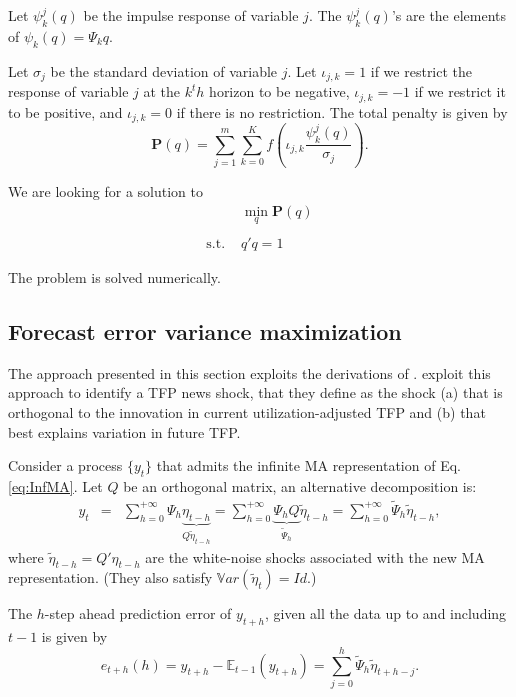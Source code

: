 \documentclass[
]{book}
\theoremstyle{definition}
\theoremstyle{definition}
\theoremstyle{definition}
\theoremstyle{definition}
\theoremstyle{remark}
\begin{document}
Let \(\psi_k^j(q)\) be the impulse response of variable \(j\). The \(\psi_k^j(q)\)'s are the elements of \(\psi_k(q)=\Psi_kq\).

Let \(\sigma_j\) be the standard deviation of variable \(j\). Let \(\iota_{j,k}=1\) if we restrict the response of variable \(j\) at the \(k^th\) horizon to be negative, \(\iota_{j,k}=-1\) if we restrict it to be positive, and \(\iota_{j,k}=0\) if there is no restriction. The total penalty is given by \[
\mathbf{P}(q)=\sum_{j=1}^m\sum_{k=0}^Kf\left(\iota_{j,k}\frac{\psi_k^j(q)}{\sigma_j}\right).
\]

We are looking for a solution to
\[\begin{array}{ll}&\min_q \mathbf{P}(q)\\
&\\
\text{s.t. }&q'q=1\end{array}\]

The problem is solved numerically.

\hypertarget{forecast-error-variance-maximization}{%
\subsection{Forecast error variance maximization}\label{forecast-error-variance-maximization}}

The approach presented in this section exploits the derivations of \citet{Uhlig_2004}. \citet{BARSKY2011273} exploit this approach to identify a TFP news shock, that they define as the shock (a) that is orthogonal to the innovation in current utilization-adjusted TFP and (b) that best explains variation in future TFP.

Consider a process \(\{y_t\}\) that admits the infinite MA representation of Eq. \eqref{eq:InfMA}. Let \(Q\) be an orthogonal matrix, an alternative decomposition is:
\begin{eqnarray}
y_t&=&\sum_{h=0}^{+\infty}\Psi_h\underbrace{\eta_{t-h}}_{Q\tilde \eta_{t-h}} = \sum_{h=0}^{+\infty}\underbrace{\Psi_hQ}_{\tilde\Psi_h}\tilde
\eta_{t-h} = \sum_{h=0}^{+\infty}\tilde\Psi_h\tilde \eta_{t-h},
\end{eqnarray}
where \(\tilde \eta_{t-h}=Q'\eta_{t-h}\) are the white-noise shocks associated with the new MA representation. (They also satisfy \(\mathbb{V}ar(\tilde\eta_t)=Id\).)

The \(h\)-step ahead prediction error of \(y_{t+h}\), given all the data up to and including \(t-1\) is given by
\[
e_{t+h}(h)=y_{t+h}-\mathbb{E}_{t-1}(y_{t+h})=\sum_{j=0}^h\tilde \Psi_h\tilde \eta_{t+h-j}.
\]
\end{document}
